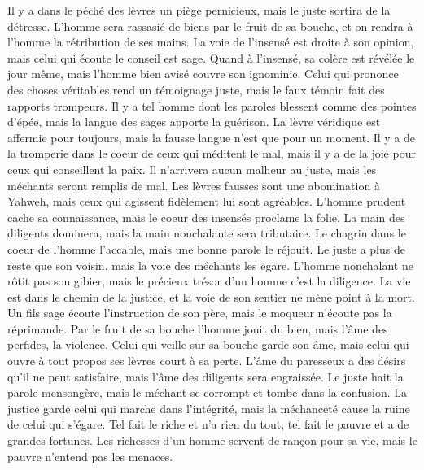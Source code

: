\begin{multicols}{2}
Il y a dans le péché des lèvres un piège pernicieux, mais le juste sortira de la détresse.
L'homme sera rassasié de biens par le fruit de sa bouche, et on rendra à l'homme la rétribution de ses mains.
La voie de l'insensé est droite à son opinion, mais celui qui écoute le conseil est sage.
Quand à l'insensé, sa colère est révélée le jour même, mais l'homme bien avisé couvre son ignominie.
Celui qui prononce des choses véritables rend un témoignage juste, mais le faux témoin fait des rapports trompeurs.
Il y a tel homme dont les paroles blessent comme des pointes d'épée, mais la langue des sages apporte la guérison.
La lèvre véridique est affermie pour toujours, mais la fausse langue n'est que pour un moment.
Il y a de la tromperie dans le coeur de ceux qui méditent le mal, mais il y a de la joie pour ceux qui conseillent la paix.
Il n'arrivera aucun malheur au juste, mais les méchants seront remplis de mal.
Les lèvres fausses sont une abomination à Yahweh, mais ceux qui agissent fidèlement lui sont agréables.
L'homme prudent cache sa connaissance, mais le coeur des insensés proclame la folie.
La main des diligents dominera, mais la main nonchalante sera tributaire.
Le chagrin dans le coeur de l'homme l'accable, mais une bonne parole le réjouit.
Le juste a plus de reste que son voisin, mais la voie des méchants les égare.
L'homme nonchalant ne rôtit pas son gibier, mais le précieux trésor d'un homme c'est la diligence.
La vie est dans le chemin de la justice, et la voie de son sentier ne mène point à la mort.
\VerseOne{}Un fils sage écoute l'instruction de son père, mais le moqueur n'écoute pas la réprimande.
Par le fruit de sa bouche l'homme jouit du bien, mais l'âme des perfides, la violence.
Celui qui veille sur sa bouche garde son âme, mais celui qui ouvre à tout propos ses lèvres court à sa perte.
L'âme du paresseux a des désirs qu'il ne peut satisfaire, mais l'âme des diligents sera engraissée.
Le juste hait la parole mensongère, mais le méchant se corrompt et tombe dans la confusion.
La justice garde celui qui marche dans l'intégrité, mais la méchanceté cause la ruine de celui qui s'égare.
Tel fait le riche et n'a rien du tout, tel fait le pauvre et a de grandes fortunes.
Les richesses d'un homme servent de rançon pour sa vie, mais le pauvre n'entend pas les menaces.

\end{multicols}
